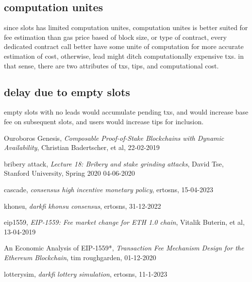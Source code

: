 \documentclass{article}
\begin{document}
\subsection{ computation unites}
since slots has limited computation unites, computation unites is better suited for fee estimation than gas price based of block size, or type of contract, every dedicated contract call better have some unite of computation for more accurate estimation of cost, otherwise, lead might ditch computationally expensive txs. in that sense, there are two attributes of txs, tips, and computational cost.

\subsection{ delay due to empty slots}
 empty slots with no leads would accumulate pending txs, and would increase base fee on subsequent slots, and users would increase tips for inclusion.



\begin{thebibliography}{999}

  Ouroboros Genesis,
  \emph{Composable Proof-of-Stake Blockchains with Dynamic Availability},
  Christian Badertscher, et al,
  22-02-2019

  bribery attack,
  \emph{Lecture 18: Bribery and stake grinding attacks},
  David Tse,
  Stanford University, Spring 2020
  04-06-2020

  cascade,
  \emph{consensus high incentive monetary policy},
  ertosns,
  15-04-2023

  khonsu,
  \emph{darkfi khonsu consensus},
  ertosns,
  31-12-2022

  eip1559,
  \emph{EIP-1559: Fee market change for ETH 1.0 chain},
  Vitalik Buterin, et al,
  13-04-2019

  An Economic Analysis of EIP-1559*,
  \emph{Transaction Fee Mechanism Design for the Ethereum Blockchain},
  tim roughgarden,
  01-12-2020

  lotterysim,
  \emph{darkfi lottery simulation},
  ertosns,
  11-1-2023
\end{thebibliography}
\end{document}
